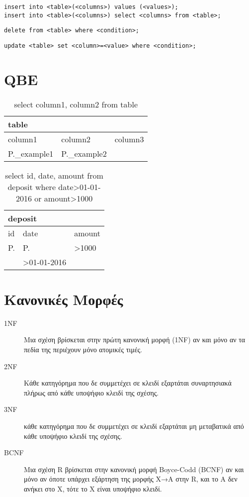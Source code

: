 \begin{lstlisting}[caption=insert examples]
insert into <table>(<columns>) values (<values>);
insert into <table>(<columns>) select <columns> from <table>;
\end{lstlisting}

\begin{lstlisting}[caption=delete example]
delete from <table> where <condition>;
\end{lstlisting}

\begin{lstlisting}[caption=update]
update <table> set <column>=<value> where <condition>;
\end{lstlisting}

\section{QBE}

\begin{table}[ht!]
	\centering
	\caption{select column1, column2 from table}
	\begin{tabularx}{0.9\textwidth}{|X|X|X|}
		\hline
		\multicolumn{3}{|X|}{table} \\
		\hline
		column1 & column2 & column3 \\
		\hline
		P.\_example1 & P.\_example2 & {} \\
		\hline
	\end{tabularx}
\end{table}


\begin{table}[ht!]
	\centering
	\caption{select id, date, amount from deposit where date>01-01-2016 or amount>1000}
	\begin{tabularx}{0.9\textwidth}{|X|X|X|}
		\hline
		\multicolumn{3}{|X|}{deposit} \\
		\hline
		id & date & amount \\
		\hline
		{P.} & {P.} & {>1000} \\
		\hline
		{} & {>01-01-2016} & {} \\
		\hline
	\end{tabularx}
\end{table}


\section{Κανονικές Μορφές}

\begin{description}
	\item[1NF]	Μια σχέση βρίσκεται στην πρώτη κανονική μορφή (1NF) αν και μόνο αν 
			τα πεδία της περιέχουν μόνο ατομικές τιμές.
	\item[2NF]	Κάθε κατηγόρημα που δε συμμετέχει σε κλειδί εξαρτάται συναρτησιακά πλήρως 
			από κάθε υποψήφιο κλειδί της σχέσης.
	\item[3NF]	κάθε κατηγόρημα που δε συμμετέχει σε κλειδί εξαρτάται 
			μη μεταβατικά από κάθε υποψήφιο κλειδί της σχέσης.
	\item[BCNF]	Μια σχέση R βρίσκεται στην κανονική μορφή Boyce-Codd (BCNF) αν και μόνο αν 
			όποτε υπάρχει εξάρτηση της μορφής Χ→Α στην R, και το Α δεν ανήκει στο Χ, 
			τότε το Χ είναι υποψήφιο κλειδί.
\end{description}

